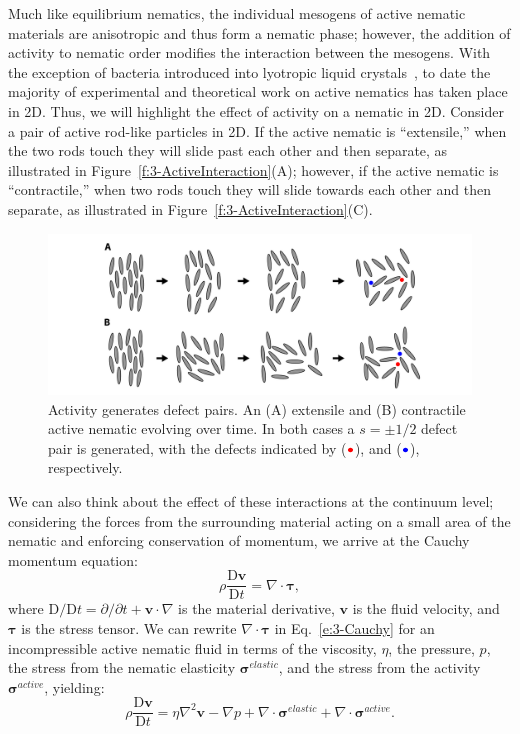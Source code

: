 Much like equilibrium nematics, the individual mesogens of active nematic materials are anisotropic and thus form a nematic phase; however, the addition of activity to nematic order modifies the interaction between the mesogens.
With the exception of bacteria introduced into lyotropic liquid crystals~\cite{RN86}, to date the majority of experimental and theoretical work on active nematics has taken place in 2D.
Thus, we will highlight the effect of activity on a nematic in 2D.
Consider a pair of active rod-like particles in 2D.
If the active nematic is ``extensile,'' when the two rods touch they will slide past each other and then separate, as illustrated in Figure~\ref{f:3-ActiveInteraction}(A); however, if the active nematic is ``contractile,'' when two rods touch they will slide towards each other and then separate, as illustrated in Figure~\ref{f:3-ActiveInteraction}(C).
\begin{figure}
  \centering
  \includegraphics{figures/C3/Ch3-Figs_ActiveDefectGen.png}
  \caption{Activity generates defect pairs.
  An (A) extensile and (B) contractile active nematic evolving over time.
  In both cases a $s = \pm 1/2$ defect pair is generated, with the defects indicated by (${\color{red} \bullet}$), and (${\color{blue} \bullet}$), respectively.}\label{f:3-ActiveDefectGen}
\end{figure}

We can also think about the effect of these interactions at the continuum level; considering the forces from the surrounding material acting on a small area of the nematic and enforcing conservation of momentum, we arrive at the Cauchy momentum equation:
\begin{equation}
  \rho \frac{\textrm{D} \mathbf{v}}{\textrm{D}t } = \nabla \cdot \bm{\tau},\label{e:3-Cauchy}
\end{equation}
where $\textrm{D}/\textrm{D}t = \partial/\partial t + \mathbf{v} \cdot \nabla$ is the material derivative, $\mathbf{v}$ is the fluid velocity, and $\bm{\tau}$ is the stress tensor.
We can rewrite $\nabla \cdot \bm{\tau}$ in Eq.~\ref{e:3-Cauchy} for an incompressible active nematic fluid in terms of the viscosity, $\eta$, the pressure, $p$, the stress from the nematic elasticity $\bm{\sigma}^{elastic}$, and the stress from the activity $\bm{\sigma}^{active}$, yielding:
\begin{equation}
  \rho \frac{\textrm{D} \mathbf{v}}{\textrm{D}t } = \eta \nabla^2 \mathbf{v} - \nabla p + \nabla \cdot \bm{\sigma}^{elastic} + \nabla \cdot \bm{\sigma}^{active}.\label{e:3-NavierStokes}
\end{equation}

